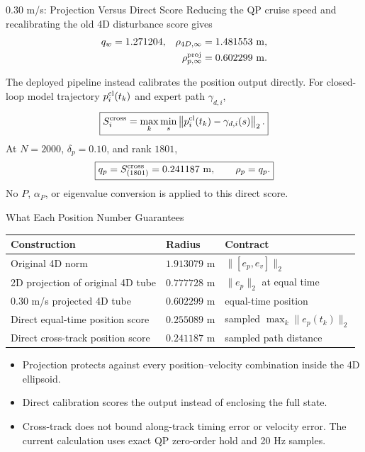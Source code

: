 \documentclass[aspectratio=43,11pt]{beamer}
\begin{document}
\begin{frame}{0.30 m/s: Projection Versus Direct Score}
Reducing the QP cruise speed and recalibrating the old 4D disturbance score gives
\[
\begin{aligned}
q_w&=1.271204, & \rho_{4D,\infty}&=1.481553\ {\rm m},\\
&& \rho_{p,\infty}^{\rm proj}&=0.602299\ {\rm m}.
\end{aligned}
\]

The deployed pipeline instead calibrates the position output directly. For
closed-loop model trajectory $p_i^{\rm cl}(t_k)$ and expert path $\gamma_{d,i}$,
\[
\boxed{
S_i^{\rm cross}
=\max_k\min_s\left\|p_i^{\rm cl}(t_k)-\gamma_{d,i}(s)\right\|_2.}
\]
At $N=2000$, $\delta_p=0.10$, and rank $1801$,
\[
\boxed{q_p=S_{(1801)}^{\rm cross}=0.241187\ {\rm m},
\qquad \rho_p=q_p.}
\]
No $P$, $\alpha_P$, or eigenvalue conversion is applied to this direct score.
\end{frame}

\begin{frame}{What Each Position Number Guarantees}
\footnotesize
\begin{tabular}{@{}p{}p{}p{}@{}}
\toprule
Construction & Radius & Contract \\
\midrule
Original 4D norm & $1.913079$ m & $\|[e_p,e_v]\|_2$ \\
2D projection of original 4D tube & $0.777728$ m & $\|e_p\|_2$ at equal time \\
0.30 m/s projected 4D tube & $0.602299$ m & equal-time position \\
Direct equal-time position score & $0.255089$ m & sampled $\max_k\|e_p(t_k)\|_2$ \\
Direct cross-track position score & $\mathbf{0.241187}$ m & sampled path distance \\
\bottomrule
\end{tabular}

\vspace{0.25em}
\begin{itemize}
  \item Projection protects against every position--velocity combination
  inside the 4D ellipsoid.
  \item Direct calibration scores the output instead of enclosing the full state.
  \item Cross-track does not bound along-track timing error or velocity error.
  The current calculation uses exact QP zero-order hold and 20 Hz samples.
\end{itemize}
\end{frame}
\end{document}
